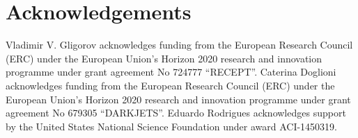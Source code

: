\section*{Acknowledgements}
Vladimir V. Gligorov acknowledges funding from the European Research Council (ERC) under the European Union's Horizon 2020 research and innovation programme under grant agreement No 724777 ``RECEPT''. Caterina Doglioni acknowledges funding from the European Research Council (ERC) under the European Union's Horizon 2020 research and innovation programme under grant agreement No 679305  ``DARKJETS''.  Eduardo Rodrigues acknowledges support by the United States National Science Foundation under award ACI-1450319. 
